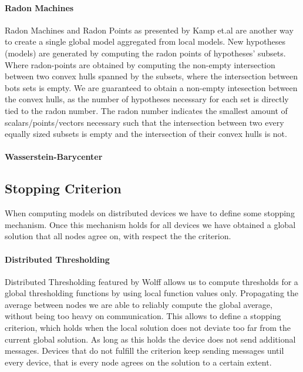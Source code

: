     \paragraph{Radon Machines}
    Radon Machines and Radon Points as presented by Kamp et.al \cite{kamp2017effective} are another way to create a single global model aggregated from local models. New hypotheses (models) are generated by computing the radon points of hypotheses' subsets. Where radon-points are obtained by computing the non-empty intersection between two convex hulls spanned by the subsets, where the intersection between bots sets is empty.
    We are guaranteed to obtain a non-empty intesection between the convex hulls, as the number of hypotheses necessary for each set is directly tied to the radon number. 
    The radon number indicates the smallest amount of scalars/points/vectors necessary such that the intersection between two every equally sized subsets is empty and the intersection of their convex hulls is not.
    
    \paragraph{Wasserstein-Barycenter}

    \subsection{Stopping Criterion}
    When computing models on distributed devices we have to define some stopping mechanism.
    Once this mechanism holds for all devices we have obtained a global solution that all nodes agree on, with respect the the criterion.

    \paragraph{Distributed Thresholding} 
    Distributed Thresholding featured by Wolff \cite{wolff2013local} allows us to compute thresholds for a global thresholding functions by using local function values only. Propagating the average between nodes we are able to reliably compute the global average, without being too heavy on communication.
    This allows to define a stopping criterion, which holds when the local solution does not deviate too far from the current global solution. 
    As long as this holds the device does not send additional messages.
    Devices that do not fulfill the criterion keep sending messages until every device, that is every node agrees on the solution to a certain extent.

